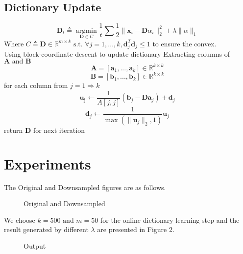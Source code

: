 \documentclass[UTF8]{article}
\begin{document}
\subsection{Dictionary Update}
\[\bm{D}_t \triangleq \mathop{\arg\min}\limits_{\bm{D} \in C} \frac{1}{t} \sum{ \frac{1}{2} \| \bm{x}_i - \bm{D} \alpha_i  \|^2_2 + \lambda \|\alpha\|_1}
\]
Where $C \triangleq {\bm{D} \in \mathbb{R}^{m \times k} \text{ s.t. } \forall j = 1, ..., k, \bm{d}_j^T\bm{d}_j \leq 1}$ to ensure the convex.
\\
Using block-coordinate descent to update dictionary
Extracting columns of $\bm{A} \text{ and } \bm{B}$
\[\bm{A} = [\bm{a}_1, ..., \bm{a}_k] \in \mathbb{R}^{k \times k}\]
\[\bm{B} = [\bm{b}_1, ..., \bm{b}_k] \in \mathbb{R}^{k \times k}\]
for each column from $j = 1 \Rightarrow k$
\[\bm{u_j} \leftarrow \frac{1}{A[j, j]}(\bm{b}_j - \bm{Da}_j) + \bm{d}_j\]
\[\bm{d}_j \leftarrow \frac{1}{\max(\|\bm{u}_j\|_2, 1)}\bm{u}_j\]
return $\bm{D}$ for next iteration


\section{Experiments}
The Original and Downsampled figures are as follows.
\begin{figure}[H]
    \centering
    \caption{Original and Downsampled}
\end{figure}

We choose $k = 500 \text{ and } m = 50$ for the online dictionary learning step and the result generated by different $\lambda$ are presented in Figure 2.

\begin{figure}[H]
    \centering
    \caption{Output}
\end{figure}



\nocite{*}
\end{document}
